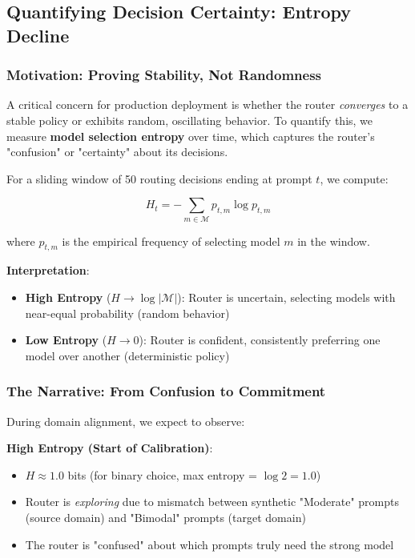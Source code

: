 \subsection{Quantifying Decision Certainty: Entropy Decline}
\label{sec:entropy_analysis}

\subsubsection{Motivation: Proving Stability, Not Randomness}

A critical concern for production deployment is whether the router \emph{converges} to a stable policy or exhibits random, oscillating behavior. To quantify this, we measure \textbf{model selection entropy} over time, which captures the router's "confusion" or "certainty" about its decisions.

For a sliding window of 50 routing decisions ending at prompt $t$, we compute:

\begin{equation}
    H_t = -\sum_{m \in \mathcal{M}} p_{t,m} \log p_{t,m}
\end{equation}

where $p_{t,m}$ is the empirical frequency of selecting model $m$ in the window. 

\textbf{Interpretation}:
\begin{itemize}
    \item \textbf{High Entropy} ($H \to \log|\mathcal{M}|$): Router is uncertain, selecting models with near-equal probability (random behavior)
    \item \textbf{Low Entropy} ($H \to 0$): Router is confident, consistently preferring one model over another (deterministic policy)
\end{itemize}

\subsubsection{The Narrative: From Confusion to Commitment}

During domain alignment, we expect to observe:

\textbf{High Entropy (Start of Calibration)}:
\begin{itemize}
    \item $H \approx 1.0$ bits (for binary choice, max entropy = $\log 2 = 1.0$)
    \item Router is \emph{exploring} due to mismatch between synthetic "Moderate" prompts (source domain) and "Bimodal" prompts (target domain)
    \item The router is "confused" about which prompts truly need the strong model
\end{itemize}

